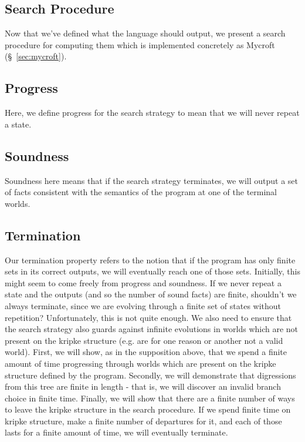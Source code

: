 \subsection{Search Procedure}
\label{sec:search}
Now that we've defined what the language should output, we present a search procedure for computing them which is implemented concretely as Mycroft (\S~\ref{sec:mycroft}).
\subsection{Progress}
\label{sec:progress}
Here, we define progress for the search strategy to mean that we will never repeat a state.
\subsection{Soundness}
\label{sec:soundness}
Soundness here means that if the search strategy terminates, we will output a set of facts consistent with the semantics of the program at one of the terminal worlds.
\subsection{Termination}
\label{sec:term} 
Our termination property refers to the notion that if the program has only finite sets in its correct outputs, we will eventually reach one of those sets.
Initially, this might seem to come freely from progress and soundness.
If we never repeat a state and the outputs (and so the number of sound facts) are finite, shouldn't we always terminate, since we are evolving through a finite set of states without repetition?
Unfortunately, this is not quite enough.
We also need to ensure that the search strategy also guards against infinite evolutions in worlds which are not present on the kripke structure (e.g. are for one reason or another not a valid world).
First, we will show, as in the supposition above, that we spend a finite amount of time progressing through worlds which are present on the kripke structure defined by the program.
Secondly, we will demonstrate that digressions from this tree are finite in length - that is, we will discover an invalid branch choice in finite time.
Finally, we will show that there are a finite number of ways to leave the kripke structure in the search procedure. 
If we spend finite time on kripke structure, make a finite number of departures for it, and each of those lasts for a finite amount of time, we will eventually terminate.

